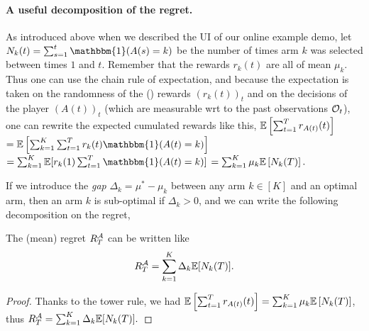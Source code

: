 \paragraph{A useful decomposition of the regret.}
%
As introduced above when we described the UI of our online example demo, let $N_k(t) = \sum_{s=1}^t \mathbbm{1}(A(s) = k)$ be the number of times arm $k$ was selected between times $1$ and $t$.
Remember that the rewards $r_k(t)$ are all \iid{} of mean $\mu_k$.
Thus one can use the chain rule of expectation, and because the expectation is taken on the randomness of the (\iid) rewards $(r_k(t))_t$ and on the decisions of the player $(A(t))_t$ (which are measurable wrt to the past observations $\mathcal{O}_t$),
one can rewrite the expected cumulated rewards like this,
$\mathbb{E} \left[ \sum_{t=1}^T r_{A(t)}(t) \right]$
$= \E \left[ \sum_{k=1}^K \sum_{t=1}^T r_k(t) \mathbbm{1}(A(t) = k) \right]$
$= \sum_{k=1}^K \E [ r_k(1) \sum_{t=1}^T \mathbbm{1}(A(t) = k) ]$
$= \sum_{k=1}^K \mu_k \mathbb{E} \left[ N_k(T) \right].$

If we introduce the \emph{gap} $\Delta_k = \mu^* - \mu_k$ between any arm $k\in[K]$ and an optimal arm,
then an arm $k$ is sub-optimal if $\Delta_k > 0$, and we can write the following decomposition on the regret,

\begin{lemma}\label{lem:2:RegretDecomposition}
    The (mean) regret $R_T^{\mathcal{A}}$ can be written like
    \begin{equation}
        R_T^{\mathcal{A}} = \sum_{k=1}^K \Delta_k \mathbb{E}[ N_k(T) ].
    \end{equation}
\end{lemma}
%
\begin{proof}\label{proof:2:RegretDecomposition}
    Thanks to the tower rule, we had
    $\mathbb{E} \left[ \sum_{t=1}^T r_{A(t)}(t) \right] = \sum_{k=1}^K \mu_k \mathbb{E} \left[ N_k(T) \right]$, thus $R_T^{\mathcal{A}} = \sum_{k=1}^K \Delta_k \mathbb{E}[ N_k(T) ].$
\end{proof}

